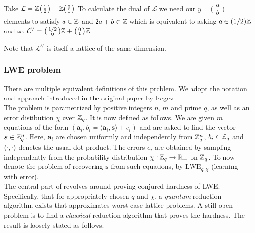 \begin{example}
    Take $\mathcal{L}= \mathbb{Z} 
        \big(\begin{smallmatrix} 1\\2 \end{smallmatrix}\big) + 
        \mathbb{Z} \big(\begin{smallmatrix} 0\\ 1 \end{smallmatrix}\big)$
        To calculate the dual of $\mathcal{L}$ we need our $y = \big(\begin{smallmatrix}
          a\\b\end{smallmatrix}\big)$ elements to satisfy $a \in \mathbb{Z}$ and $2a + b \in \mathbb{Z}$ which is equivalent to asking $a \in (1/2)\mathbb{Z}$ and so $\mathcal{L}^{\vee} = \big(\begin{smallmatrix}
          1/2\\0
        \end{smallmatrix}\big)\mathbb{Z} + \big(\begin{smallmatrix}
          0\\1
        \end{smallmatrix}\big) \mathbb{Z}$
\end{example}

Note that $\mathcal{L}^{\vee}$ is itself a lattice of the same dimension.
\fi

\subsubsection*{LWE problem}
There are multiple equivalent definitions of this problem. We adopt the notation and approach introduced in the original paper \cite{regev} by Regev. \\
The problem is parametrized by positive integers $n$, $m$ and prime $q$, as well as an error distibution $\chi$ over $\mathbb{Z}_q$. It is now defined as follows. We are given $m$ equations of the form $(\bm{a}_i, b_i = \langle \bm{a}_i, \bm{s} \rangle + e_i)$ and are asked to find the vector $\boldsymbol{s} \in \mathbb{Z}_q^n$. Here, $\bm{a}_i$ are chosen uniformly and independently from $\mathbb{Z}_q^n$, $b_i \in \mathbb{Z}_q$ and $\langle \cdot, \cdot \rangle$ denotes the usual dot product. The errors $e_i$ are obtained by sampling independently from the probability distribution $\chi : \mathbb{Z}_q \rightarrow \mathbb{R}_{+}$ on $\mathbb{Z}_q$. To now denote the problem of recovering $\bm{s}$ from such equations, by $\text{LWE}_{q, \chi}$ (learning with error). \\
The central part of \cite{regev} revolves around proving conjured hardness of LWE. Specifically, that for appropriately chosen $q$ and $\chi$, a \textit{quantum} reduction algorithm exists that approximates worst-case lattice problems. A still open problem is to find a \textit{classical} reduction algorithm that proves the hardness. The result is loosely stated as follows.

